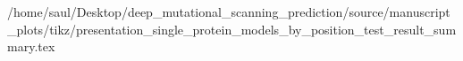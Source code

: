 /home/saul/Desktop/deep_mutational_scanning_prediction/source/manuscript_plots/tikz/presentation_single_protein_models_by_position_test_result_summary.tex